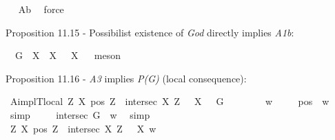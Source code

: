 \begin{isabellebody}
\ %
\endisadelimproof
%
\isatagproof
{}\isamarkupfalse%
\ A{}b\ \isamarkupfalse%
\ force%
\endisatagproof
{\isafoldproof}%
%
\isadelimproof
%
\endisadelimproof
%
\begin{isamarkuptext}%
Proposition 11.15 - Possibilist existence of \emph{God} directly implies \emph{A1b}:%
\end{isamarkuptext}\isamarkuptrue%
\isamarkupfalse%
\ {\isachardoublequoteopen}{\isasymlfloor}\isactrlbold {\isasymexists}\ G{\isacharasterisk}\ \isactrlbold {\isasymrightarrow}\ {\isacharparenleft}\isactrlbold {\isasymforall}X{\isachardot}\ \isactrlbold {\isasymnot}{\isacharparenleft}{\isasymP}\ X{\isacharparenright}\ \isactrlbold {\isasymrightarrow}\ {\isasymP}\ {\isacharparenleft}\isactrlbold {\isasymrightharpoondown}X{\isacharparenright}{\isacharparenright}{\isasymrfloor}{\isachardoublequoteclose}%
\isadelimproof
\ %
\endisadelimproof
%
\isatagproof
{}\isamarkupfalse%
\ meson%
\endisatagproof
{\isafoldproof}%
%
\isadelimproof
%
\endisadelimproof
%
\begin{isamarkuptext}%
Proposition 11.16 - \emph{A3} implies \emph{P(G)} (local consequence):%
\end{isamarkuptext}\isamarkuptrue%
\isamarkupfalse%
\ A{}implT{}{\isacharunderscore}local{\isacharcolon}\ {\isachardoublequoteopen}{\isasymlfloor}{\isacharparenleft}\isactrlbold {\isasymforall}Z\ X{\isachardot}\ {\isacharparenleft}pos\ Z\ \isactrlbold {\isasymand}\ intersec\ X\ Z{\isacharparenright}\ \isactrlbold {\isasymrightarrow}\ {\isasymP}\ X{\isacharparenright}\ \isactrlbold {\isasymrightarrow}\ {\isasymP}\ G{\isasymrfloor}{\isachardoublequoteclose}\isanewline
%
\isadelimproof
%
\endisadelimproof
%
\isatagproof
{}\isamarkupfalse%
\ {\isacharminus}\isanewline
\ \ \isacommand{{\isacharbraceleft}}\isamarkupfalse%
\isanewline
\ \ \isamarkupfalse%
\ w\isanewline
\ \ \isamarkupfalse%
\ {}{\isacharcolon}\ {\isachardoublequoteopen}pos\ {\isasymP}\ w{\isachardoublequoteclose}\ \isamarkupfalse%
\ simp\isanewline
\ \ \isamarkupfalse%
\ {}{\isacharcolon}\ {\isachardoublequoteopen}intersec\ G\ {\isasymP}\ w{\isachardoublequoteclose}\ \isamarkupfalse%
\ simp\isanewline
\ \ \isacommand{{\isacharbraceleft}}\isamarkupfalse%
\ \ \ \ \isanewline
\ \ \ \ \isamarkupfalse%
\ {\isachardoublequoteopen}{\isacharparenleft}\isactrlbold {\isasymforall}Z\ X{\isachardot}\ {\isacharparenleft}pos\ Z\ \isactrlbold {\isasymand}\ intersec\ X\ Z{\isacharparenright}\ \isactrlbold {\isasymrightarrow}\ {\isasymP}\ X{\isacharparenright}\ w{\isachardoublequoteclose}\isanewline

\end{isabellebody}
